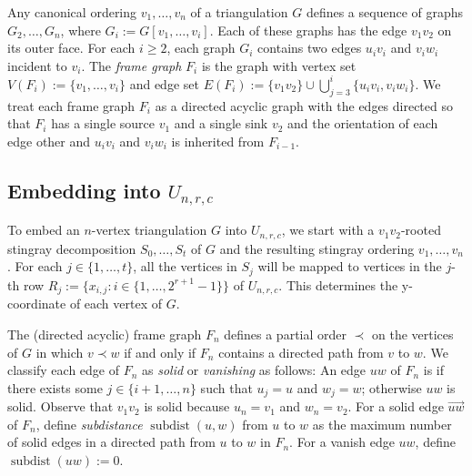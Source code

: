 \documentclass{patmorin}
\newcommand{\defin}[1]{\emph{\color{brightmaroon}#1}}
\DeclareMathOperator{\sd}{subdist}
\begin{document}
Any canonical ordering $v_1,\ldots,v_n$ of a triangulation $G$ defines a sequence of graphs $G_2,\ldots,G_n$, where $G_i:=G[v_1,\ldots,v_i]$.  Each of these graphs has the edge $v_1v_2$ on its outer face.  For each $i\ge 2$, each graph $G_i$ contains two edges $u_iv_i$ and $v_iw_i$ incident to $v_i$.   The \defin{frame graph} $F_i$ is the graph with vertex set $V(F_i):=\{v_1,\ldots,v_i\}$ and edge set $E(F_i):=\{v_1v_2\}\cup \bigcup_{j=3}^i\{u_iv_i,v_iw_i\}$.  We treat each frame graph $F_i$ as a directed acyclic graph with the edges directed so that $F_i$ has a single source $v_1$ and a single sink $v_2$ and the orientation of each edge other and $u_iv_i$ and $v_iw_i$ is inherited from $F_{i-1}$.

\subsection{\boldmath Embedding into $U_{n,r,c}$}

To embed an $n$-vertex triangulation $G$ into $U_{n,r,c}$, we start with a $v_1v_2$-rooted stingray decomposition $S_0,\ldots,S_t$ of $G$ and the resulting stingray ordering $v_1,\ldots,v_n$.  For each $j\in\{1,\ldots,t\}$, all the vertices in $S_j$ will be mapped to vertices in the $j$-th row $R_j:=\{x_{i,j}:i\in\{1,\ldots,2^{r+1}-1\}\}$ of $U_{n,r,c}$.  This determines the y-coordinate of each vertex of $G$.

The (directed acyclic) frame graph $F_n$ defines a partial order $\prec$ on the vertices of $G$ in which $v\prec w$ if and only if $F_n$ contains a directed path from $v$ to $w$.  We classify each edge of $F_n$ as \defin{solid} or \defin{vanishing} as follows:  An edge $uw$ of $F_n$ is if there exists some $j\in\{i+1,\ldots,n\}$ such that $u_j=u$ and $w_j=w$; otherwise $uw$ is solid.  Observe that $v_1v_2$ is solid because $u_n=v_1$ and $w_n=v_2$.  For a solid edge $\overrightarrow{uw}$ of $F_n$, define \defin{subdistance} $\sd(u,w)$ from $u$ to $w$ as the maximum number of solid edges in a directed path from $u$ to $w$ in $F_n$.  For a vanish edge $uw$, define $\sd(uw):=0$.

\end{document}
